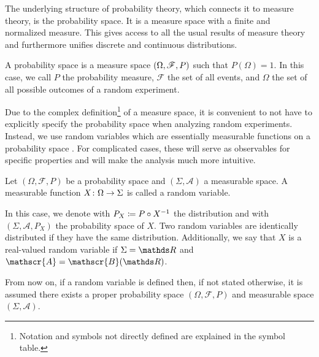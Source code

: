 \documentclass{stdlocal}
\begin{document}
    The underlying structure of probability theory, which connects it to measure theory, is the probability space.
    It is a measure space with a finite and normalized measure.
    This gives access to all the usual results of measure theory and furthermore unifies discrete and continuous distributions.
    \autocite[\ppno~193-195]{schmidt2009}

    \begin{definition}
      A probability space is a measure space $\left( \Omega, \mathscr{F}, P \right)$ such that $P(\Omega)=1$.
      In this case, we call $P$ the probability measure, $\mathscr{F}$ the set of all events, and $\Omega$ the set of all possible outcomes of a random experiment.
    \end{definition}
    Due to the complex definition\footnote{Notation and symbols not directly defined are explained in the symbol table.} of a measure space, it is convenient to not have to explicitly specify the probability space when analyzing random experiments.
    Instead, we use random variables which are essentially measurable functions on a probability space \autocite[\pno~194]{schmidt2009}.
    For complicated cases, these will serve as observables for specific properties and will make the analysis much more intuitive.

    \begin{definition}
      Let $(\Omega,\mathscr{F},P)$ be a probability space and $(\Sigma,\mathscr{A})$ a measurable space.
      A measurable function $X\colon\Omega\to\Sigma$ is called a random variable.

      In this case, we denote with $P_X\coloneqq P\circ{X}^{-1}$ the distribution and with $(\Sigma,\mathscr{A},P_X)$ the probability space of $X$.
      Two random variables are identically distributed if they have the same distribution.
      Additionally, we say that $X$ is a real-valued random variable if $\Sigma = \setReal$ and $\mathscr{A} = \mathscr{B}(\setReal)$.
    \end{definition}
    From now on, if a random variable is defined then, if not stated otherwise, it is assumed there exists a proper probability space $(\Omega,\mathscr{F},P)$ and measurable space $(\Sigma, \mathscr{A})$.
\end{document}
